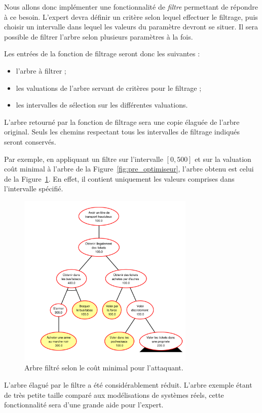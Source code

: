		Nous allons donc implémenter une fonctionnalité de \textit{filtre} permettant de répondre à ce besoin. L'expert devra définir un critère selon lequel effectuer le filtrage, puis choisir un intervalle dans lequel les valeurs du paramètre devront se situer. Il sera possible de filtrer l'arbre selon plusieurs paramètres à la fois.

		Les entrées de la fonction de filtrage seront donc les suivantes :
		\begin{itemize}
			\item l'arbre à filtrer ;
			\item les valuations de l'arbre servant de critères pour le filtrage ;
			\item les intervalles de sélection sur les différentes valuations.
		\end{itemize}
		L'arbre retourné par la fonction de filtrage sera une copie élaguée de l'arbre original. Seuls les chemins respectant tous les intervalles de filtrage indiqués seront conservés.

		Par exemple, en appliquant un filtre sur l'intervalle $[0, 500]$ et sur la valuation \og coût minimal \fg{} à l'arbre de la {\sc Figure}~\ref{fig:pre_optimiseur}, l'arbre obtenu est celui de la {\sc Figure}~\ref{fig:arbre_post_filtre}. En effet, il contient uniquement les valeurs comprises dans l'intervalle spécifié. 
		\begin{figure}[!h]
			\begin{center}
				\includegraphics[width=0.75\textwidth]{figure/post_filtre.pdf}
			\end{center}
			\caption{Arbre filtré selon le coût minimal pour l'attaquant.}
			\label{fig:arbre_post_filtre}
		\end{figure}
		L'arbre élagué par le filtre a été considérablement réduit. L'arbre exemple étant de très petite taille comparé aux modélisations de systèmes réels, cette fonctionnalité sera d'une grande aide pour l'expert.


